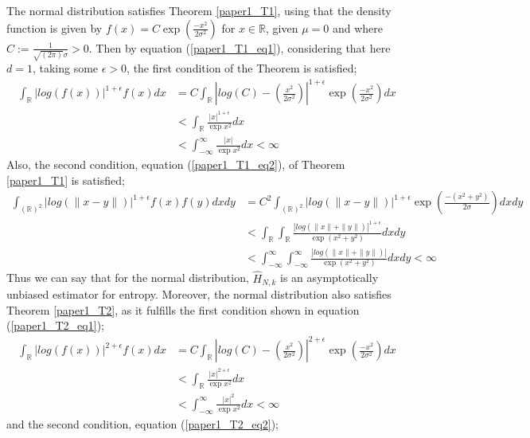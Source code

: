 \documentclass{article}
\begin{document}
The normal distribution satisfies Theorem \ref{paper1_T1}, using that the density function is given by $f(x) = C \exp{ \left( \frac{-x^2}{2\sigma^2} \right)}$ for $x \in \mathbb{R}$, given $\mu = 0$ and where $C:= \frac{1}{\sqrt{(2\pi)} \sigma} > 0$. Then by equation (\ref{paper1_T1_eq1}), considering that here $d=1$, taking some $\epsilon >0$, the first condition of the Theorem is satisfied;
\begin{align} \nonumber
\int_{\mathbb{R}} | log(f(x))|^{1 + \epsilon} f(x) dx  &= C \int_{\mathbb{R}} \left| log \left( C \right) -  \left( \frac{x^2}{2\sigma^2} \right) \right|^{1 + \epsilon} \exp{ \left( \frac{-x^2}{2\sigma^2} \right)} dx \\ \nonumber
&< \int_{\mathbb{R}} \frac{|x|^{1 + \epsilon}}{ \exp{x^2}} dx \\ \nonumber
&< \int_{-\infty}^{\infty} \frac{|x|}{ \exp{x^2}} dx < \infty \nonumber
\end{align}
Also, the second condition, equation (\ref{paper1_T1_eq2}), of Theorem \ref{paper1_T1} is satisfied;
\begin{align} \nonumber
\int_{(\mathbb{R})^2} | log(\|x-y\|)|^{1+ \epsilon} f(x) f(y) dx dy  &= C^2 \int_{(\mathbb{R})^2} | log(\|x-y\|)|^{1+ \epsilon} \exp{\left(\frac{-(x^2 + y^2)}{2 \sigma}\right)} dx dy \\ \nonumber
&< \int_{\mathbb{R}} \int_{\mathbb{R}} \frac{| log(\|x\| + \|y\|)|^{1+ \epsilon}}{\exp{(x^2 + y^2)}} dx dy \\ \nonumber
&< \int_{-\infty}^{\infty} \int_{-\infty}^{\infty} \frac{| log(\|x\| + \|y\|)|}{\exp{(x^2 + y^2)}} dx dy < \infty  \nonumber
\end{align}
Thus we can say that for the normal distribution, $\hat{H}_{N,k}$ is an asymptotically unbiased estimator for entropy. Moreover, the normal distribution also satisfies Theorem \ref{paper1_T2}, as it fulfills the first condition shown in equation (\ref{paper1_T2_eq1});
\begin{align} \nonumber
\int_{\mathbb{R}} | log(f(x))|^{2 + \epsilon} f(x) dx  &= C \int_{\mathbb{R}} \left| log \left( C \right) -  \left( \frac{x^2}{2\sigma^2} \right) \right|^{2 + \epsilon} \exp{ \left( \frac{-x^2}{2\sigma^2} \right)} dx \\ \nonumber
&< \int_{\mathbb{R}} \frac{|x|^{2 + \epsilon}}{ \exp{x^2}} dx \\ \nonumber
&< \int_{-\infty}^{\infty} \frac{|x|^2}{ \exp{x^2}} dx < \infty \nonumber
\end{align}
and the second condition, equation (\ref{paper1_T2_eq2});
\end{document}
